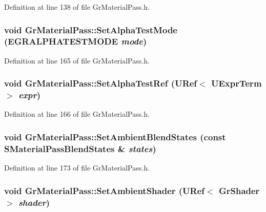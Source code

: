 Definition at line 138 of file GrMaterialPass.h.\hypertarget{class_gr_material_pass_e274892d545d45e5b1814f3752cc9b63}{
\subsubsection[{SetAlphaTestMode}]{\setlength{\rightskip}{0pt plus 5cm}void GrMaterialPass::SetAlphaTestMode ({\bf EGRALPHATESTMODE} {\em mode})}}
\label{class_gr_material_pass_e274892d545d45e5b1814f3752cc9b63}




Definition at line 165 of file GrMaterialPass.h.\hypertarget{class_gr_material_pass_a1d660422bfd38ecb23256ca4abf1239}{
\subsubsection[{SetAlphaTestRef}]{\setlength{\rightskip}{0pt plus 5cm}void GrMaterialPass::SetAlphaTestRef ({\bf URef}$<$ {\bf UExprTerm} $>$ {\em expr})}}
\label{class_gr_material_pass_a1d660422bfd38ecb23256ca4abf1239}




Definition at line 166 of file GrMaterialPass.h.\hypertarget{class_gr_material_pass_d52b02b6e3e016f47b15fe62d834531c}{
\subsubsection[{SetAmbientBlendStates}]{\setlength{\rightskip}{0pt plus 5cm}void GrMaterialPass::SetAmbientBlendStates (const {\bf SMaterialPassBlendStates} \& {\em states})}}
\label{class_gr_material_pass_d52b02b6e3e016f47b15fe62d834531c}




Definition at line 173 of file GrMaterialPass.h.\hypertarget{class_gr_material_pass_5b1a5c20c0299b3e7eda73d377021509}{
\subsubsection[{SetAmbientShader}]{\setlength{\rightskip}{0pt plus 5cm}void GrMaterialPass::SetAmbientShader ({\bf URef}$<$ {\bf GrShader} $>$ {\em shader})}}
\label{class_gr_material_pass_5b1a5c20c0299b3e7eda73d377021509}




